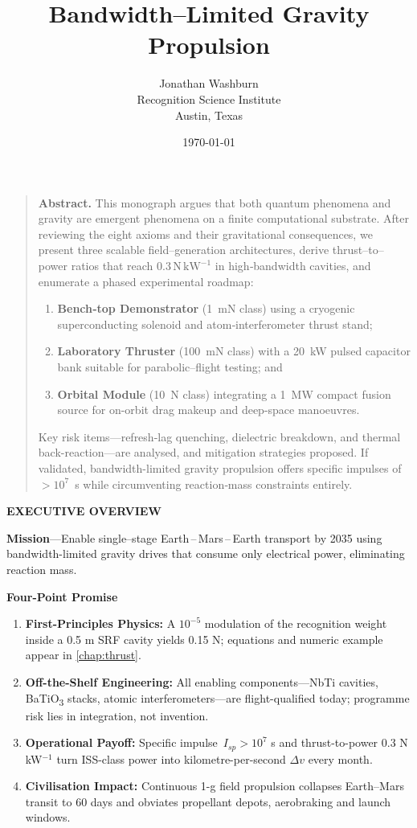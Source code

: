 \documentclass[12pt,letterpaper]{book}
\title{Bandwidth--Limited Gravity Propulsion}
\author{Jonathan Washburn\\Recognition Science Institute\\Austin, Texas}
\date{\today}
\begin{document}
\maketitle

\begin{quotation}
\noindent\textbf{Abstract.}
This monograph argues that both quantum phenomena and gravity are emergent phenomena on a finite computational substrate.  After reviewing the eight axioms and their gravitational consequences, we present three scalable field–generation architectures, derive thrust–to–power ratios that reach $0.3\,\mathrm{N\,kW^{-1}}$ in high‐bandwidth cavities, and enumerate a phased experimental roadmap:
\begin{enumerate}
  \item \textbf{Bench‐top Demonstrator} (1~mN class) using a cryogenic superconducting solenoid and atom‐interferometer thrust stand;
  \item \textbf{Laboratory Thruster} (100~mN class) with a 20~kW pulsed capacitor bank suitable for parabolic–flight testing; and
  \item \textbf{Orbital Module} (10~N class) integrating a 1~MW compact fusion source for on-orbit drag makeup and deep-space manoeuvres.
\end{enumerate}
Key risk items—refresh-lag quenching, dielectric breakdown, and thermal back-reaction—are analysed, and mitigation strategies proposed.  If validated, bandwidth-limited gravity propulsion offers specific impulses of $>10^7$~s while circumventing reaction‐mass constraints entirely.
\end{quotation}

\textbf{\large EXECUTIVE OVERVIEW}

\noindent\textbf{Mission}\;—Enable single–stage Earth\,–\,Mars\,–\,Earth transport by 2035 using bandwidth-limited gravity drives that consume only electrical power, eliminating reaction mass.

\medskip
\noindent\textbf{Four-Point Promise}
\begin{enumerate}
  \item \textbf{First-Principles Physics:} A $10^{-5}$ modulation of the recognition weight inside a 0.5 m SRF cavity yields 0.15 N; equations and numeric example appear in \cref{chap:thrust}.
  \item \textbf{Off-the-Shelf Engineering:} All enabling components—NbTi cavities, BaTiO\textsubscript{3} stacks, atomic interferometers—are flight-qualified today; programme risk lies in integration, not invention.
  \item \textbf{Operational Payoff:} Specific impulse $\,I_{sp}>10^{7}$ s and thrust-to-power 0.3 N kW$^{-1}$ turn ISS-class power into kilometre-per-second \(\Delta v\) every month.
  \item \textbf{Civilisation Impact:} Continuous 1-g field propulsion collapses Earth–Mars transit to 60 days and obviates propellant depots, aerobraking and launch windows.
\end{enumerate}
\end{document}
